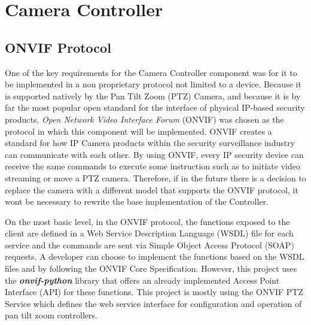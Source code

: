 \documentclass{l4proj}
\begin{document}
 

\chapter{Camera Controller}

\section{ONVIF Protocol}
One of the key requirements for the Camera Controller component was for it to be implemented in a non proprietary protocol not limited to a device. Because it is supported natively by the Pan Tilt Zoom (PTZ) Camera, and because it is by far the most popular open standard for the interface of physical IP-based security products, \textit{Open Network Video Interface Forum} (ONVIF) was chosen as the protocol in which this component will be implemented. ONVIF creates a standard for how IP Camera products within the security surveillance industry can communicate with each other. By using ONVIF, every IP security device can receive the same commands to execute some instruction such as to initiate video streaming or move a PTZ camera. Therefore, if in the future there is a decision to replace the camera with a different model that supports the ONVIF protocol, it wont be necessary to rewrite the base implementation of the Controller. 

On the most basic level, in the ONVIF protocol, the functions exposed to the client are defined in a Web Service Description Language (WSDL) file for each service and the commands are sent via Simple Object Access Protocol (SOAP) requests. A developer can choose to implement the functions based on the WSDL files and by following the ONVIF Core Specification. However, this project uses the \textbf{\textit{onvif-python}} library that offers an already implemented Access Point Interface (API) for these functions. This project is mostly using the ONVIF PTZ Service which defines the web service interface for configuration and operation of pan tilt zoom controllers. 
\end{document}
